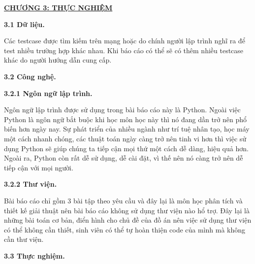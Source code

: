 \newpage
\changefontsizes{16pt}
\centerline{\textbf{\hyperlink{page.6}{CHƯƠNG 3: THỰC NGHIỆM}}}

%
\bigskip
\changefontsizes{14pt}

\setlength{\parindent}{0.0cm}
\textbf{3.1 Dữ liệu.}

\smallskip
\changefontsizes{13pt}
\setlength{\parindent}{1cm}

Các testcase được tìm kiếm trên mạng hoặc do chính người lập trình nghĩ ra để test nhiều trường hợp khác nhau. Khi báo cáo có thể sẽ có thêm nhiều testcase khác do người hướng dẫn cung cấp.

\bigskip
\changefontsizes{14pt}

\setlength{\parindent}{0.0cm}
\textbf{3.2 Công nghệ.}


\smallskip
\changefontsizes{14pt}

\setlength{\parindent}{0.5cm}
\textbf{3.2.1 Ngôn ngữ lập trình.}

\smallskip
\changefontsizes{13pt}
\setlength{\parindent}{1cm}

Ngôn ngữ lập trình được sử dụng trong bài báo cáo này là Python. Ngoài việc Python là ngôn ngữ bắt buộc khi học môn học này thì nó đang dần trở nên phổ biến hơn ngày nay. Sự phát triển của nhiều ngành như trí tuệ nhân tạo, học máy một cách nhanh chóng, các thuật toán ngày càng trở nên tinh vi hơn thì việc sử dụng Python sẽ giúp chúng ta tiếp cận mọi thứ một cách dễ dàng, hiệu quả hơn. Ngoài ra, Python còn rất dễ sử dụng, dễ cài đặt, vì thế nên nó càng trở nên dễ tiếp cận với mọi người.


\bigskip
\changefontsizes{14pt}


\setlength{\parindent}{0.5cm}
\textbf{3.2.2 Thư viện.}

\smallskip
\changefontsizes{13pt}
\setlength{\parindent}{1cm}

Bài báo cáo chỉ gồm 3 bài tập theo yêu cầu và đây lại là môn học phân tích và thiết kế giải thuật nên bài báo cáo không sử dụng thư viện nào hổ trợ. Đây lại là những bài toán cơ bản, điển hình cho chủ đề của đồ án nên việc sử dụng thư viện có thể không cần thiết, sinh viên có thể tự hoàn thiện code của mình mà không cần thư viện.


\bigskip
\changefontsizes{14pt}

\setlength{\parindent}{0.0cm}
\textbf{3.3 Thực nghiệm.}

\smallskip
\changefontsizes{14pt}

